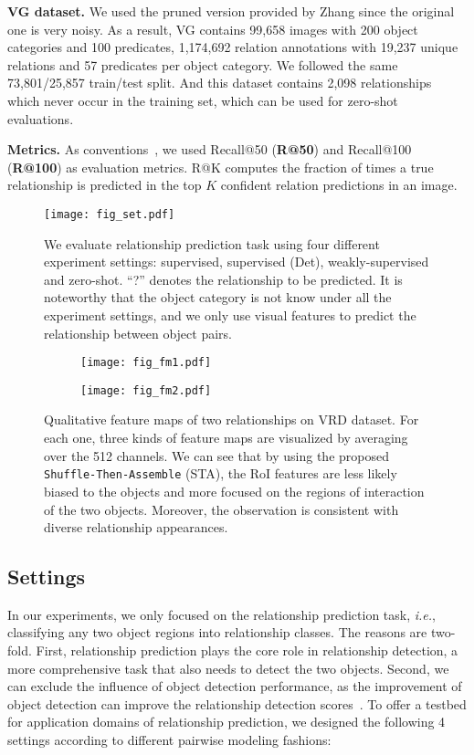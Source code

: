 \documentclass[runningheads]{llncs}
\newcommand{\ie}{\textit{i.e.}}
\begin{document}
\noindent\textbf{VG dataset.} We used the pruned version provided by Zhang\cite{zhang2017visual} since the original one is very noisy. As a result, VG contains 99,658 images with 200 object categories and 100 predicates, 1,174,692 relation annotations with 19,237 unique relations and 57 predicates per object category. We followed the same 73,801/25,857 train/test split. And this dataset contains 2,098 relationships which never occur in the training set, which can be used for zero-shot evaluations. 

\noindent\textbf{Metrics.} As conventions~\cite{lu2016visual,zhang2017visual}, we used Recall@50 (\textbf{R@50}) and Recall@100 (\textbf{R@100}) as evaluation metrics. R@K computes the fraction of times a true relationship is predicted in the top $K$ confident relation predictions in an image. 
\begin{figure}[t!]
\centering
\texttt{[image: fig\_set.pdf]}
\caption{ We evaluate relationship prediction task using four different experiment settings: supervised, supervised (Det), weakly-supervised and zero-shot. ``?'' denotes the relationship to be predicted. It is noteworthy that the object category is not know under all the experiment settings, and we only use visual features to predict the relationship between object pairs.
}
\label{fig:4}
\end{figure}

\begin{figure}[t!]
\centering
 \begin{subfigure}{0.8\textwidth} %
		\texttt{[image: fig\_fm1.pdf]}
	\end{subfigure}
	\begin{subfigure}{0.8\textwidth} %
		\texttt{[image: fig\_fm2.pdf]}
	\end{subfigure}
\caption{Qualitative feature maps of two relationships on VRD dataset. For each one, three kinds of feature maps are visualized by averaging over the 512 channels. We can see that by using the proposed \texttt{Shuffle-Then-Assemble} (STA), the RoI features are less likely biased to the objects and more focused on the regions of interaction of the two objects. Moreover, the observation is consistent with diverse relationship appearances.
}
\label{fig:5}
\end{figure}

\subsection{Settings}
In our experiments, we only focused on the relationship prediction task, \ie, classifying any two object regions into relationship classes. The reasons are two-fold. First, relationship prediction plays the core role in relationship detection, a more comprehensive task that also needs to detect the two objects. Second, we can exclude the influence of object detection performance, as the improvement of object detection can improve the relationship detection scores~\cite{zhang2017visual}. To offer a testbed for application domains of relationship prediction, we designed the following 4 settings according to different pairwise modeling fashions:
\end{document}
